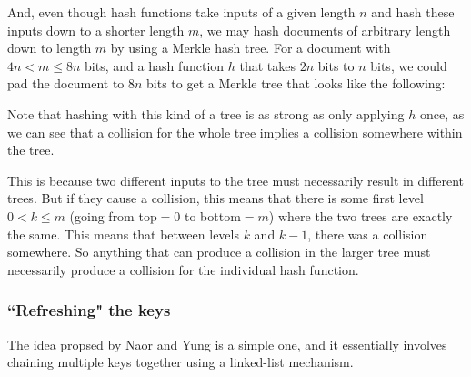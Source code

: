 \documentclass[11pt]{article}
\begin{document}
And, even though hash functions take inputs of a given length \(n\) and hash these inputs down to a shorter length \(m\), we may hash documents of arbitrary length down to length \(m\) by using a Merkle hash tree. For a document with \(4n<m\le 8n\) bits, and a hash function \(h\) that takes \(2n\) bits to \(n\) bits, we could pad the document to \(8n\) bits to get a Merkle tree that looks like the following:
\begin{center}
\end{center}

Note that hashing with this kind of a tree is as strong as only applying \(h\) once, as we can see that a collision for the whole tree implies a collision somewhere within the tree.\smallskip

This is because two different inputs to the tree must necessarily result in different trees. But if they cause a collision, this means that there is some first level \(0<k\le m\) (going from top\(=0\) to bottom\(=m\)) where the two trees are exactly the same. This means that between levels \(k\) and \(k-1\), there was a collision somewhere. So anything that can produce a collision in the larger tree must necessarily produce a collision for the individual hash function.

\subsubsection{``Refreshing" the keys}
The idea propsed by Naor and Yung is a simple one, and it essentially involves chaining multiple keys together using a linked-list mechanism. \medskip
\end{document}
